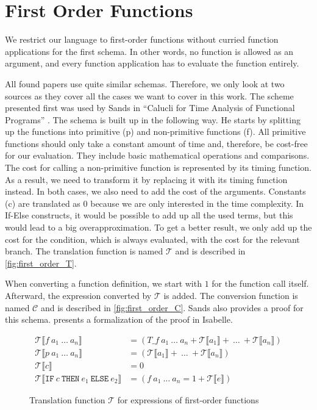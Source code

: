 

\section{First Order Functions} \label{chapter:first_order}

We restrict our language to first-order functions without curried function applications for the first schema.
In other words, no function is allowed as an argument, and every function application has to evaluate the function entirely.

All found papers use quite similar schemas.
Therefore, we only look at two sources as they cover all the cases we want to cover in this work.
The scheme presented first was used by Sands in ``Calucli for Time Analysis of Functional Programs'' \parencite{sands}.
The schema is built up in the following way.
He starts by splitting up the functions into primitive (p) and non-primitive functions (f).
All primitive functions should only take a constant amount of time and, therefore, be cost-free for our evaluation.
They include basic mathematical operations and comparisons.
The cost for calling a non-primitive function is represented by its timing function.
As a result, we need to transform it by replacing it with its timing function instead.
In both cases, we also need to add the cost of the arguments.
Constants (c) are translated as $0$ because we are only interested in the time complexity.
In If-Else constructs, it would be possible to add up all the used terms,
but this would lead to a big overapproximation.
To get a better result, we only add up the cost for the condition, which is always evaluated, with the cost for the relevant branch.
The translation function is named $\mathcal{T}$ and is described in \autoref{fig:first_order_T}.

When converting a function definition, we start with $1$ for the function call itself.
Afterward, the expression converted by $\mathcal{T}$ is added.
The conversion function is named $\mathcal{C}$ and is described in \autoref{fig:first_order_C}.
Sands also provides a proof for this schema.
 presents a formalization of the proof in Isabelle.

\begin{figure}
  \begin{align*}
    \mathcal{T}\llbracket f\ a_{1}\ \dots\ a_{n}\rrbracket &= (T\_f\ a_{1}\ \dots\ a_{n} + \mathcal{T}\llbracket a_{1}\rrbracket +\ \dots\ + \mathcal{T}\llbracket a_{n}\rrbracket)\\
    \mathcal{T}\llbracket p\ a_{1}\ \dots\ a_{n}\rrbracket &= (\mathcal{T}\llbracket a_{1}\rrbracket +\ \dots\ + \mathcal{T}\llbracket a_{n}\rrbracket)\\
    \mathcal{T}\llbracket c\rrbracket &= 0\\
    \mathcal{T}\llbracket \texttt{IF}\ c\ \texttt{THEN}\ e_{1}\ \texttt{ELSE}\ e_{2}\rrbracket &= (f\ a_{1}\ \dots\ a_{n} = 1 + \mathcal{T}\llbracket e\rrbracket)
  \end{align*}
  \caption{Translation function $\mathcal{T}$ for expressions of first-order functions}
  \label{fig:first_order_T}
\end{figure}

